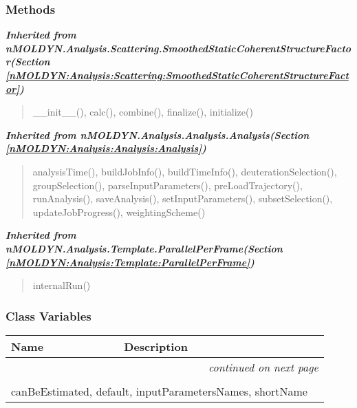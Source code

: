 
  \subsubsection{Methods}


\large{\textbf{\textit{Inherited from nMOLDYN.Analysis.Scattering.SmoothedStaticCoherentStructureFactor\textit{(Section \ref{nMOLDYN:Analysis:Scattering:SmoothedStaticCoherentStructureFactor})}}}}

\begin{quote}
\_\_init\_\_(), calc(), combine(), finalize(), initialize()
\end{quote}

\large{\textbf{\textit{Inherited from nMOLDYN.Analysis.Analysis.Analysis\textit{(Section \ref{nMOLDYN:Analysis:Analysis:Analysis})}}}}

\begin{quote}
analysisTime(), buildJobInfo(), buildTimeInfo(), deuterationSelection(), groupSelection(), parseInputParameters(), preLoadTrajectory(), runAnalysis(), saveAnalysis(), setInputParameters(), subsetSelection(), updateJobProgress(), weightingScheme()
\end{quote}

\large{\textbf{\textit{Inherited from nMOLDYN.Analysis.Template.ParallelPerFrame\textit{(Section \ref{nMOLDYN:Analysis:Template:ParallelPerFrame})}}}}

\begin{quote}
internalRun()
\end{quote}


  \subsubsection{Class Variables}

    \vspace{-1cm}
\hspace{\varindent}\begin{longtable}{|p{\varnamewidth}|p{\vardescrwidth}|l}
\cline{1-2}
\cline{1-2} \centering \textbf{Name} & \centering \textbf{Description}& \\
\cline{1-2}
\endhead\cline{1-2}\multicolumn{3}{r}{\small\textit{continued on next page}}\\\endfoot\cline{1-2}
\endlastfoot\multicolumn{2}{|l|}{\textit{Inherited from nMOLDYN.Analysis.Scattering.SmoothedStaticCoherentStructureFactor \textit{(Section \ref{nMOLDYN:Analysis:Scattering:SmoothedStaticCoherentStructureFactor})}}}\\
\multicolumn{2}{|p{\varwidth}|}{\raggedright canBeEstimated, default, inputParametersNames, shortName}\\
\cline{1-2}
\end{longtable}

